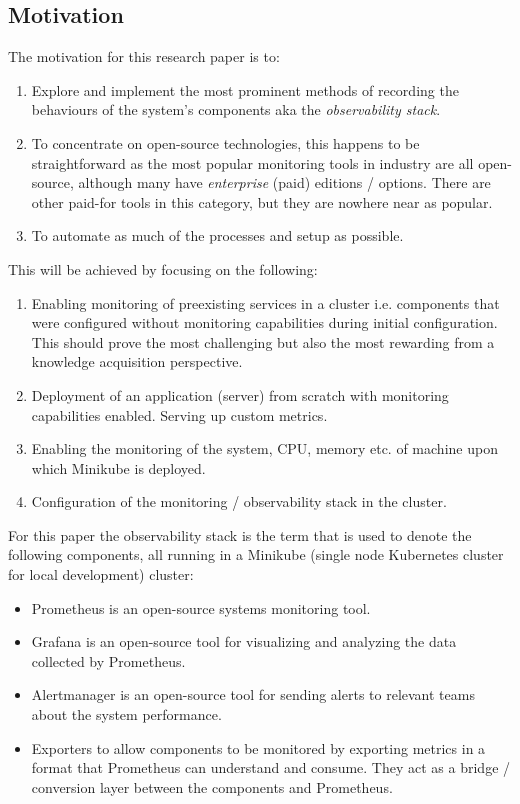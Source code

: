 \subsection{Motivation}
The motivation for this research paper is to:
\begin{enumerate}
	\item Explore and implement the most prominent methods of recording the behaviours of the system's components
	      aka the \emph{observability stack}.
	\item To concentrate on open-source technologies, this happens to be straightforward as the most popular
	      monitoring tools in industry are all open-source, although many have \emph{enterprise} (paid) editions / options.
	      There are other paid-for tools in this category, but they are nowhere near as popular.
	\item To automate as much of the processes and setup as possible.
\end{enumerate}
This will be achieved by focusing on the following:
\begin{enumerate}
	\item Enabling monitoring of preexisting services in a cluster i.e. components that were configured without monitoring
	      capabilities during initial configuration. This should prove the most challenging but also the most rewarding from a
	      knowledge acquisition perspective.
	\item Deployment of an application (server) from scratch with monitoring capabilities enabled. Serving up custom metrics.
	\item Enabling the monitoring of the system, CPU, memory etc. of machine upon which Minikube is deployed.
	\item Configuration of the monitoring / observability stack in the cluster.
\end{enumerate}
For this paper the observability stack is the term that is used to denote the following components, all running in a Minikube
(single node Kubernetes cluster for local development) cluster:
\begin{itemize}
	\item Prometheus\autocite{prometheusPrometheusMonitoringSystemb} is an open-source systems monitoring tool.
	\item Grafana\autocite{GrafanaOpenObservabilitya} is an open-source tool for visualizing and analyzing
	      the data collected by Prometheus.
	\item Alertmanager\autocite{prometheusAlertmanagerPrometheus} is an open-source tool for sending alerts
	      to relevant teams about the system performance.
	\item Exporters to allow components to be monitored by exporting metrics in a format that Prometheus can understand and
	      consume. They act as a bridge / conversion layer between the components and Prometheus.
\end{itemize}
